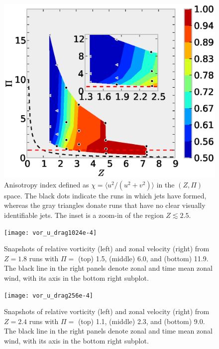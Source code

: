 \documentclass{ametsoc}
\begin{document}
\begin{figure}
\begin{center}
\includegraphics[width=6in]{anisotropic_index}\caption{Anisotropy index defined as $\chi=\langle u^{2}/(u^{2}+v^{2})\rangle$
in the $(Z,\Pi)$ space. The black dots indicate the runs in which
jets have formed, whereas the gray triangles donate runs that have
no clear visually identifiable jets. The inset is a zoom-in of the
region $Z\apprle2.5$.}
\label{anisotropic_index}
\end{center}
\end{figure}


\begin{figure}
\begin{center}
\texttt{[image: vor\_u\_drag1024e-4]}\caption{Snapshots of relative vorticity (left) and zonal velocity (right)
from $Z=1.8$ runs with $\Pi=$ (top) 1.5, (middle) 6.0, and (bottom)
11.9. The black line in the right panels denote zonal and time mean
zonal wind, with its axis in the bottom right subplot.}
\label{vor_u_snapshot_drag1024e-4}
\end{center}
\end{figure}


\begin{figure}
\begin{center}
\texttt{[image: vor\_u\_drag256e-4]}\caption{Snapshots of relative vorticity (left) and zonal velocity (right)
from $Z=2.4$ runs with $\Pi=$ (top) 1.1, (middle) 2.3, and (bottom)
9.0. The black line in the right panels denote zonal and time mean
zonal wind, with its axis in the bottom right subplot.}
\label{vor_u_snapshot_drag256e-4}
\end{center}
\end{figure}
\end{document}
